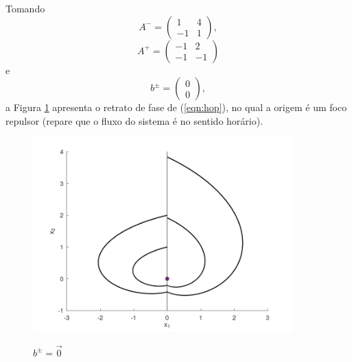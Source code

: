 Tomando 
\[
A^-=\begin{pmatrix}
1&4\\
-1&1
\end{pmatrix},
\]
\[
A^+=\begin{pmatrix}
-1&2\\
-1&-1
\end{pmatrix}
\]
e 
\[
b^\pm=\begin{pmatrix}
0\\0
\end{pmatrix},
\]
a Figura \ref{undist} apresenta o retrato de fase de (\ref{eqn:hop}), no qual a origem é um foco repulsor (repare que o fluxo do sistema é no sentido horário).
\begin{figure}[H]
\centering
\includegraphics[width=10cm]{disturb_pre}\\
\caption{\label{undist}$b^\pm=\vec{0}$}
\end{figure}
 
